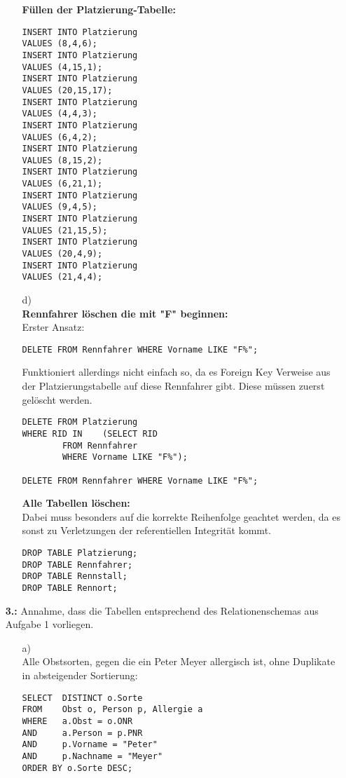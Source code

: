 \documentclass[a4paper,11pt,fleqn]{scrartcl}
\begin{document}
\begin{enumerate}
\begin{enumerate}
\textbf{Füllen der Platzierung-Tabelle:}
\begin{lstlisting}
INSERT INTO Platzierung
VALUES (8,4,6);
INSERT INTO Platzierung
VALUES (4,15,1);
INSERT INTO Platzierung
VALUES (20,15,17);
INSERT INTO Platzierung
VALUES (4,4,3);
INSERT INTO Platzierung
VALUES (6,4,2);
INSERT INTO Platzierung
VALUES (8,15,2);
INSERT INTO Platzierung
VALUES (6,21,1);
INSERT INTO Platzierung
VALUES (9,4,5);
INSERT INTO Platzierung
VALUES (21,15,5);
INSERT INTO Platzierung
VALUES (20,4,9);
INSERT INTO Platzierung
VALUES (21,4,4);
\end{lstlisting}
			
			
			\item[d)]\quad \\
\textbf{Rennfahrer löschen die mit "F" beginnen:} \\
Erster Ansatz:
\begin{lstlisting}
DELETE FROM Rennfahrer WHERE Vorname LIKE "F%";
\end{lstlisting}
Funktioniert allerdings nicht einfach so, da es Foreign Key Verweise aus der Platzierungstabelle auf diese Rennfahrer gibt. Diese müssen zuerst gelöscht werden.

\begin{lstlisting}
DELETE FROM Platzierung
WHERE RID IN	(SELECT RID
		FROM Rennfahrer
		WHERE Vorname LIKE "F%");

DELETE FROM Rennfahrer WHERE Vorname LIKE "F%";
\end{lstlisting}

\textbf{Alle Tabellen löschen:} \\
Dabei muss besonders auf die korrekte Reihenfolge geachtet werden, da es sonst zu Verletzungen der referentiellen Integrität kommt.
\begin{lstlisting}
DROP TABLE Platzierung;
DROP TABLE Rennfahrer;
DROP TABLE Rennstall;
DROP TABLE Rennort;
\end{lstlisting}
		\end{enumerate}
		\item[\textbf{3.:}]
		Annahme, dass die Tabellen entsprechend des Relationenschemas aus Aufgabe 1 vorliegen.
		\begin{enumerate}
			\item[a)]\quad \\
			Alle Obstsorten, gegen die ein Peter Meyer allergisch ist, ohne Duplikate in absteigender Sortierung:
\begin{lstlisting}
SELECT	DISTINCT o.Sorte
FROM	Obst o, Person p, Allergie a
WHERE 	a.Obst = o.ONR
AND 	a.Person = p.PNR
AND 	p.Vorname = "Peter"
AND 	p.Nachname = "Meyer"
ORDER BY o.Sorte DESC;
\end{lstlisting}


\end{enumerate}
\end{enumerate}
\end{document}
